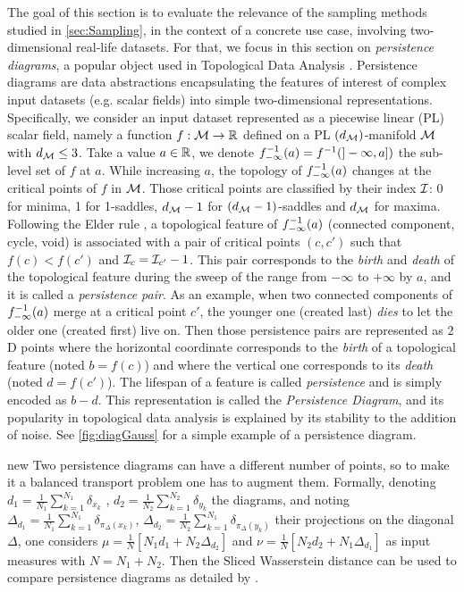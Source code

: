 {The goal of this section is to evaluate the relevance of the sampling 
methods studied in \autoref{sec:Sampling}, in the context of a concrete use 
case, involving two-dimensional real-life datasets. For that,
we focus in this section on 
\emph{persistence diagrams}, a popular object used in Topological Data Analysis 
\citep{edelsbrunner09}.}
Persistence diagrams are data abstractions encapsulating the features of 
interest {of complex input datasets (e.g. scalar fields)}
into 
simple {two-dimensional} representations. 
{Specifically, we consider an input dataset represented }
as a piecewise linear (PL) scalar field, namely a function $f: \mathcal{M} 
\rightarrow \mathbb{R}$ defined on a PL $(d_{\mathcal{M}})$-manifold $\mathcal{M}$ with $d_{\mathcal{M}} \leq 3$. 
Take a value $a\in\mathbb{R}$, we denote $f_{-\infty}^{-1}(a) = f^{-1}(]-\infty,a])$ the sub-level 
set of $f$ at $a$. While increasing $a$, the topology of $f_{-\infty}^{-1}(a)$ changes at 
the critical points of $f$ in $\mathcal{M}$. Those critical points are classified by 
their index $\mathcal{I}$: 0 for minima, 1 for 1-saddles, $d_{\mathcal{M}} - 1$ for 
$(d_{\mathcal{M}}-1)$-saddles and $d_{\mathcal{M}}$ for maxima. Following the Elder rule 
\citep{edelsbrunner09}, a topological feature of $f_{-\infty}^{-1}(a)$ (connected 
component, cycle, void) is associated with a pair of critical points $(c,c')$ 
such that $f(c) < f(c')$ and $\mathcal{I}_{c} = \mathcal{I}_{c'} - 1$.  This pair corresponds to 
{the}
\textit{birth} and \textit{death} 
{of the topological feature}
during the 
{sweep of the range from $-\infty$ to 
$+\infty$ by $a$,} 
and {it} is called a \textit{persistence pair}. As an example, when two 
connected components of $f_{-\infty}^{-1}(a)$ merge at a critical point $c'$, the younger 
one (created last) \textit{dies} to let the older one (created first) live on. 
Then those persistence pair{s} are represented as $2$D points where the 
horizontal coordinate corresponds to the \textit{birth} of a topological feature 
(noted $b = f(c)$) and where the vertical one corresponds to its \textit{death} 
(noted $d = f(c')$). The lifespan of a feature is called \textit{persistence} 
and is simply encoded as $b-d$. This representation is called the 
\textit{Persistence Diagram}, and its popularity in topological data analysis is 
explained by its stability to the addition of noise. See \autoref{fig:diagGauss} 
for a simple example of a persistence diagram.

\begin{Rk}
new{
Two persistence diagrams can have {a} different number of points, so to 
make it a balanced transport problem one has to augment them. Formally, denoting 
$d_1 =
\frac{1}{N_1}\sum\limits_{k=1}^{N_1} \delta_{x_k}$ , $d_2 = \frac{1}{N_2}\sum\limits_{k=1}^{N_2} \delta_{y_k}$ the diagrams, and noting $\Delta_{d_1} = \frac{1}{N_1}\sum\limits_{k=1}^{N_1} \delta_{\pi_{\Delta}(x_k)}$, $\Delta_{d_2} = \frac{1}{N_2}\sum\limits_{k=1}^{N_1} \delta_{\pi_{\Delta}(y_k)}$ their projections on the diagonal $\Delta$, one considers $\mu = \frac{1}{N} [N_1 d_1 + N_2 \Delta_{d_2}]$ and $\nu = \frac{1}{N} [N_2 d_2 + N_1 \Delta_{d_1}]$ as input measures with $N = N_1 + N_2$. Then the Sliced Wasserstein distance can be used to compare persistence diagrams as detailed by \citet{carriere2017slicedwassersteinkernelpersistence}.}
\end{Rk}

